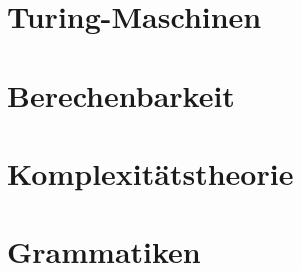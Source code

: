 \documentclass{article}
\begin{document}
\newsection
\section{Turing-Maschinen}
\setcounter{subsection}{2}




\newsection
\section{Berechenbarkeit}





\newsection
\section{Komplexitätstheorie}






\newsection
\section{Grammatiken}

\end{document}
